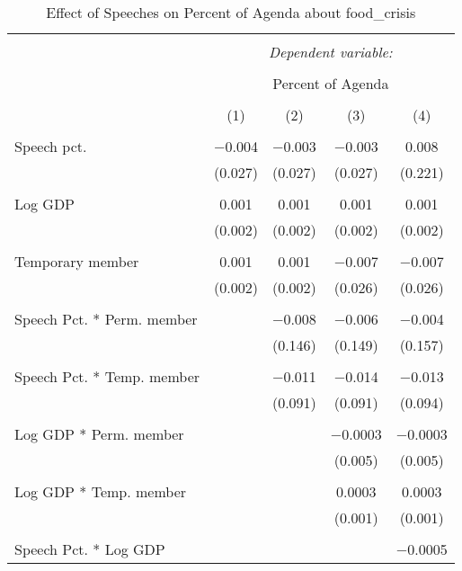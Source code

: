
\begin{table}[!htbp] \centering 
  \caption{Effect of Speeches on Percent of Agenda about  food_crisis} 
  \label{} 
\begin{tabular}{@{\extracolsep{5pt}}lcccc} 
\\[-1.8ex]\hline 
\hline \\[-1.8ex] 
 & \multicolumn{4}{c}{\textit{Dependent variable:}} \\ 
\cline{2-5} 
\\[-1.8ex] & \multicolumn{4}{c}{Percent of Agenda} \\ 
\\[-1.8ex] & (1) & (2) & (3) & (4)\\ 
\hline \\[-1.8ex] 
 Speech pct. & $-$0.004 & $-$0.003 & $-$0.003 & 0.008 \\ 
  & (0.027) & (0.027) & (0.027) & (0.221) \\ 
  & & & & \\ 
 Log GDP & 0.001 & 0.001 & 0.001 & 0.001 \\ 
  & (0.002) & (0.002) & (0.002) & (0.002) \\ 
  & & & & \\ 
 Temporary member & 0.001 & 0.001 & $-$0.007 & $-$0.007 \\ 
  & (0.002) & (0.002) & (0.026) & (0.026) \\ 
  & & & & \\ 
 Speech Pct. * Perm. member &  & $-$0.008 & $-$0.006 & $-$0.004 \\ 
  &  & (0.146) & (0.149) & (0.157) \\ 
  & & & & \\ 
 Speech Pct. * Temp. member &  & $-$0.011 & $-$0.014 & $-$0.013 \\ 
  &  & (0.091) & (0.091) & (0.094) \\ 
  & & & & \\ 
 Log GDP * Perm. member &  &  & $-$0.0003 & $-$0.0003 \\ 
  &  &  & (0.005) & (0.005) \\ 
  & & & & \\ 
 Log GDP * Temp. member &  &  & 0.0003 & 0.0003 \\ 
  &  &  & (0.001) & (0.001) \\ 
  & & & & \\ 
 Speech Pct. * Log GDP &  &  &  & $-$0.0005 \\ 

\end{tabular}
\end{table}
